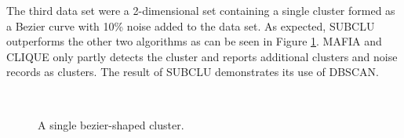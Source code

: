 The third data set were a 2-dimensional set containing a single cluster formed as a Bezier curve with 10\% noise added to the data set. As expected, SUBCLU outperforms the other two algorithms as can be seen in Figure \ref{fig:accuracy_bezier}. MAFIA and CLIQUE only partly detects the cluster and reports additional clusters and noise records as clusters. The result of SUBCLU demonstrates its use of DBSCAN.
\begin{figure}[H]
    \vspace*{-0.5cm}
    \centering
    ~~~~
    ~~~~
    \caption{A single bezier-shaped cluster.}
    \label{fig:accuracy_bezier}
\end{figure}

